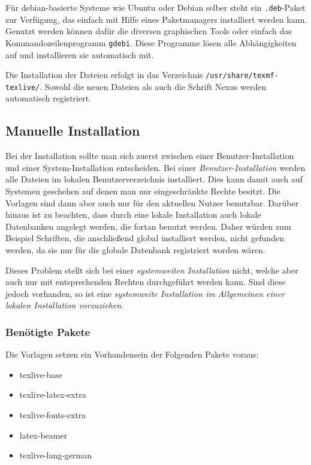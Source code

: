 Für debian-basierte Systeme wie Ubuntu oder Debian selber steht ein
\texttt{.deb}-Paket zur Verfügung, das einfach mit Hilfe eines Paketmanagers
installiert werden kann.
Genutzt werden können dafür die diversen graphischen Tools oder einfach das
Kommandozeilenprogramm \texttt{gdebi}. Diese Programme lösen alle Abhängigkeiten
auf und installieren sie automatisch mit.

Die Installation der Dateien erfolgt in das Verzeichnis
\lstinline{/usr/share/texmf-texlive/}. Sowohl die neuen Dateien als auch 
die Schrift Nexus werden automatisch registriert.

\subsection{Manuelle Installation}

Bei der Installation sollte man sich zuerst zwischen einer Benutzer-Installation
und einer System-Installation entscheiden.
Bei einer \emph{Benutzer-Installation} werden alle Dateien im lokalen Benutzerverzeichnis installiert.
Dies kann damit auch auf Systemen geschehen auf denen man nur
eingeschränkte Rechte besitzt.
Die Vorlagen sind dann aber auch nur für den aktuellen Nutzer benutzbar.
Darüber hinaus ist zu beachten, dass durch eine lokale Installation auch
lokale Datenbanken angelegt werden, die fortan benutzt werden.
Daher würden zum Beispiel Schriften, die anschließend global installiert werden,
nicht gefunden werden, da sie nur für die globale Datenbank registriert worden wären.

Dieses Problem stellt sich bei einer \emph{systemweiten Installation} nicht,
welche aber auch nur mit entsprechenden Rechten durchgeführt werden kann.
Sind diese jedoch vorhanden, so ist eine \emph{systemweite Installation im
Allgemeinen einer lokalen Installation vorzuziehen}.

\subsubsection{Benötigte Pakete}

Die Vorlagen setzen ein Vorhandensein der Folgenden Pakete voraus:

\begin{itemize}
  \item texlive-base
  \item texlive-latex-extra
  \item texlive-fonts-extra
  \item latex-beamer
  \item texlive-lang-german
\end{itemize}

